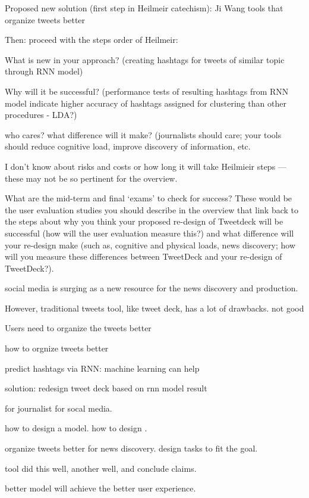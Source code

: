 Proposed new solution (first step in Heilmeir catechism): Ji Wang tools that organize tweets better

Then: proceed with the steps order of Heilmeir:

What is new in your approach? (creating hashtags for tweets of similar topic through RNN model)

Why will it be successful? (performance tests of resulting hashtags from RNN model indicate higher accuracy of hashtags assigned for clustering than other procedures - LDA?)

who cares? what difference will it make?  (journalists should care; your tools should reduce cognitive load, improve discovery of information, etc.

I don’t know about risks and costs or how long it will take Heilmieir steps — these may not be so pertinent for the overview.

What are the mid-term and final ‘exams' to check for success?  These would be the user evaluation studies you should describe in the overview that link back to the steps about why you think your proposed re-design of Tweetdeck will be successful (how will the user evaluation measure this?) and what difference will your re-design make (such as, cognitive and physical loads, news discovery; how will you measure these differences between TweetDeck and your re-design of TweetDeck?).



social media is surging as a new resource for the news discovery and production. 

However, traditional tweets tool, like tweet deck, has a lot of drawbacks.  not good

Users need to organize the tweets better

how to orgnize tweets better

predict hashtags via RNN: machine learning can help

solution: redesign tweet deck based on rnn model result

for journalist for socal media. 

how to design a model. how to design . 



organize tweets better for news discovery. design tasks to fit the goal. 

tool did this well, another well, and conclude claims. 


better model will achieve the better user experience.  



